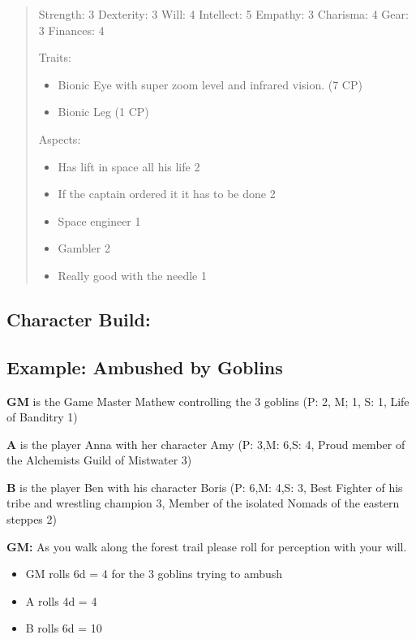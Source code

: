 \documentclass[11pt]{article}
\begin{document}
{\begin{quote}
Strength: 3
Dexterity: 3
Will: 4
Intellect: 5
Empathy: 3
Charisma: 4
Gear: 3
Finances: 4

Traits:
\begin{itemize}
\item Bionic Eye with super zoom level and infrared vision. (7 CP)
\item Bionic Leg (1 CP)
\end{itemize}

Aspects:
\begin{itemize}
\item Has lift in space all his life 2
\item If the captain ordered it it has to be done 2
\item Space engineer 1
\item Gambler 2
\item Really good with the needle 1
\end{itemize}
\end{quote}

\subsection{Character Build:}
\label{sec:orgbdde041}

\subsection{Example: Ambushed by Goblins}
\label{sec:org60c03b4}

\textbf{GM} is the Game Master Mathew controlling the 3 goblins (P: 2, M; 1, S: 1, Life of Banditry 1)

\textbf{A} is the player Anna with her character Amy (P: 3,M: 6,S: 4, Proud member of the Alchemists Guild of Mistwater 3)

\textbf{B} is the player Ben with his character Boris (P: 6,M: 4,S: 3, Best Fighter of his tribe and wrestling champion 3, Member of the isolated Nomads of the eastern steppes 2)

\textbf{GM:} As you walk along the forest trail please roll for perception with your will.
\begin{itemize}
\item GM rolls 6d = 4 for the 3 goblins trying to ambush
\item A rolls 4d =  4
\item B rolls 6d = 10
\end{itemize}

}
\end{document}
